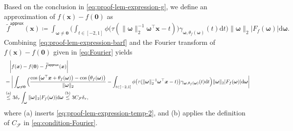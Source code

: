 \documentclass[english]{article}
\begin{document}
%
Based on the conclusion in \eqref{eq:proof-lem-expression-g}, we define an approximation of $f({\bm x}) - f({\bm 0})$ as
%
\begin{align}\label{eq:proof-lem-expression-barf}
\widetilde{f}^{\mathsf{approx}}({\bm x}) \coloneqq  \int_{\bm{\omega}\ne \bm{0}}\bigg( \int_{t\in[-2,1]} \phi\big(\tau(\|\bm{\omega}\|_2^{-1}\bm{\omega}^{\top}{\bm x} - t)\big)\gamma_{\bm{\omega}, \theta_f({\bm \omega})}(t)\mathrm{d}t \bigg)\|\bm{\omega}\|_2|F_f(\bm{\omega})|\mathrm{d}\bm{\omega}.
\end{align}
Combining \eqref{eq:proof-lem-expression-barf} and the Fourier transform of $f({\bm x}) - f(\bm{0})$ given in \eqref{eq:Fourier} yields 
%
\begin{align}
&\quad \bigg|f({\bm x}) - f(\bm{0}) - \widetilde{f}^{\mathsf{approx}}({\bm x})\bigg| \notag\\
&= \bigg| \int_{\bm{\omega}\ne \bm{0}}\Big(\frac{\cos\big({\bm{\omega}}^{\top}{\bm x} + \theta_f(\bm{\omega})\big) - \cos\big(\theta_f(\bm{\omega})\big)}{\|{\bm \omega}\|_2} - \int_{t\in[-2,1]} \phi\big(\tau(\|\bm{\omega}\|_2^{-1}\bm{\omega}^{\top}{\bm x} - t)\big)\gamma_{\bm{\omega}, \theta_f({\bm \omega})}(t)\mathrm{d}t\Big)\|{\bm \omega}\|_2|F_f({\bm{\omega}})| \mathrm{d}\bm{\omega} \bigg|\notag\\
&\overset{\text{(a)}}{\le} 3\delta_{\tau}\int_{\bm{\omega}} \|\bm{\omega}\|_2|F_f(\bm{\omega})|\mathrm{d}\bm{\omega}\overset{\text{(b)}}{\le} 3C_{\mathcal{F}}\delta_{\tau},
\label{eq:lem_expression}
\end{align}
%
where (a) inserts \eqref{eq:proof-lem-expression-temp-2}, and (b) applies the definition of $C_{\mathcal{F}}$ in \eqref{eq:condition-Fourier}.  
%
\end{document}
